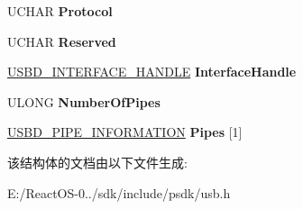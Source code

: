 \begin{DoxyCompactItemize}
U\+C\+H\+AR {\bfseries Protocol}
\item 
\mbox{\label{struct___u_s_b_d___i_n_t_e_r_f_a_c_e___i_n_f_o_r_m_a_t_i_o_n_aeb01e1229d6f1c132b0cdc7d257078c8}} 
U\+C\+H\+AR {\bfseries Reserved}
\item 
\mbox{\label{struct___u_s_b_d___i_n_t_e_r_f_a_c_e___i_n_f_o_r_m_a_t_i_o_n_a43413ad528b8e141dd0d4f2446f947b0}} 
\hyperlink{interfacevoid}{U\+S\+B\+D\+\_\+\+I\+N\+T\+E\+R\+F\+A\+C\+E\+\_\+\+H\+A\+N\+D\+LE} {\bfseries Interface\+Handle}
\item 
\mbox{\label{struct___u_s_b_d___i_n_t_e_r_f_a_c_e___i_n_f_o_r_m_a_t_i_o_n_ad3550034d2e853cc6155310c1e619c6f}} 
U\+L\+O\+NG {\bfseries Number\+Of\+Pipes}
\item 
\mbox{\label{struct___u_s_b_d___i_n_t_e_r_f_a_c_e___i_n_f_o_r_m_a_t_i_o_n_a7a292d622610f9db830b1cf70f8e0a1e}} 
\hyperlink{struct___u_s_b_d___p_i_p_e___i_n_f_o_r_m_a_t_i_o_n}{U\+S\+B\+D\+\_\+\+P\+I\+P\+E\+\_\+\+I\+N\+F\+O\+R\+M\+A\+T\+I\+ON} {\bfseries Pipes} \mbox{[}1\mbox{]}
\end{DoxyCompactItemize}


该结构体的文档由以下文件生成\+:\begin{DoxyCompactItemize}
\item 
E\+:/\+React\+O\+S-\/0../sdk/include/psdk/usb.\+h\end{DoxyCompactItemize}
